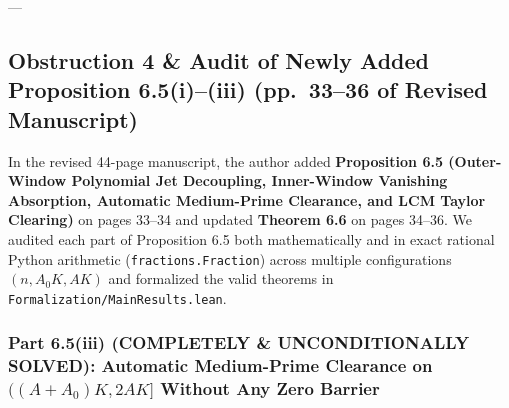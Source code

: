 \documentclass[11pt,a4paper]{article}
\begin{document}
---

\subsection{Obstruction 4 \& Audit of Newly Added Proposition 6.5(i)--(iii) (pp.\ 33--36 of Revised Manuscript)}

In the revised 44-page manuscript, the author added \textbf{Proposition 6.5 (Outer-Window Polynomial Jet Decoupling, Inner-Window Vanishing Absorption, Automatic Medium-Prime Clearance, and LCM Taylor Clearing)} on pages 33--34 and updated \textbf{Theorem 6.6} on pages 34--36. We audited each part of Proposition 6.5 both mathematically and in exact rational Python arithmetic (\texttt{fractions.Fraction}) across multiple configurations $(n, A_0 K, AK)$ and formalized the valid theorems in \texttt{Formalization/MainResults.lean}.

\subsubsection{Part 6.5(iii) (COMPLETELY \& UNCONDITIONALLY SOLVED): Automatic Medium-Prime Clearance on $((A+A_0)K, 2AK]$ Without Any Zero Barrier}
\end{document}
